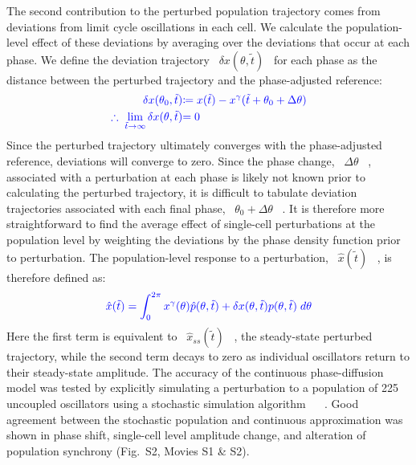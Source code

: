 \documentclass[11pt, letterpaper]{article}
\providecommand{\DIFadd}[1]{{\protect\color{blue}#1}} %
\providecommand{\DIFaddbegin}{} %
\providecommand{\DIFaddend}{} %
\begin{document}
The second contribution to the perturbed population trajectory comes from deviations from \DIFaddbegin \DIFadd{limit cycle }\DIFaddend oscillations in each cell.
\DIFaddbegin \DIFadd{We }\DIFaddend calculate the population-level effect of these deviations \DIFaddbegin \DIFadd{by averaging over the deviations that occur at each phase.
We }\DIFaddend define the deviation trajectory \DIFaddbegin \DIFadd{\mbox{%
$\delta x(\theta, \tilde{t})$
}%
}\DIFaddend for each phase as the distance between the perturbed trajectory and the phase-adjusted reference:
\DIFaddbegin \begin{align}\DIFadd{
  \delta x(\theta_0, \tilde{t}) }&\DIFadd{\coloneqq x(\tilde{t}) - x^\gamma(\tilde{t} + \theta_0 + \Delta \theta) }\\
  \DIFadd{\therefore\; \lim_{\tilde{t} \to \infty} \delta x(\theta, \tilde{t}) }&\DIFadd{= 0
}\end{align}
\DIFadd{Since the perturbed trajectory ultimately converges with the phase-adjusted reference, deviations will converge to zero.
Since the phase change, \mbox{%
$\Delta\theta$
}%
, associated with a perturbation at each phase is likely not known prior to calculating the perturbed trajectory, it is difficult to tabulate deviation trajectories associated with each final phase, \mbox{%
$\theta_0 + \Delta\theta$
}%
.
It is therefore more straightforward to find the average effect of single-cell perturbations at the population level by weighting the deviations by the phase density function prior to perturbation.
The population-level response to a perturbation, \mbox{%
$\hat{x}(\tilde{t})$
}%
, is therefore defined as:
}\begin{equation}\DIFadd{
  \hat{x}(\tilde{t}) = \int_0^{2\pi} x^\gamma(\theta)\hat{p}(\theta, \tilde{t}) + \delta x(\theta, \tilde{t})p(\theta, \tilde{t}) \; d\theta
  \label{eq:xhat}
}\end{equation}
\DIFadd{Here the first term is equivalent to \mbox{%
$\hat{x}_{ss}(\tilde{t})$
}%
, the steady-state perturbed trajectory, while the second term decays to zero as individual oscillators return to their steady-state amplitude.
}\DIFaddend The accuracy of the continuous phase-diffusion model was tested by explicitly simulating a \DIFaddbegin \DIFadd{perturbation to a }\DIFaddend population of 225 uncoupled oscillators using a stochastic simulation algorithm \DIFaddbegin \DIFadd{\mbox{%
\cite{Gillespie1977, Sanft2011a}
}%
}\DIFaddend .
Good agreement between the stochastic population and continuous approximation was shown in phase shift, single-cell level amplitude change, and alteration of population synchrony (Fig.\DIFaddbegin \DIFadd{~}\DIFaddend S2, Movies S1 \& S2).
\end{document}
